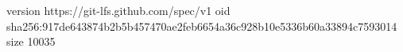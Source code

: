 version https://git-lfs.github.com/spec/v1
oid sha256:917de643874b2b5b457470ae2feb6654a36c928b10e5336b60a33894c7593014
size 10035
